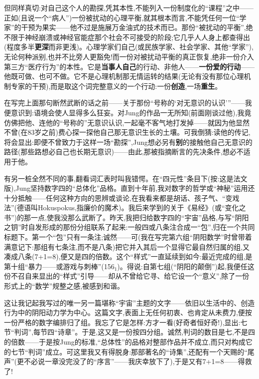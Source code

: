 但同样真切:对自己这个人的勘探,凭其本性,不能列入一份制度化的“课程”之中——正如(且说一个“病人”)一份被扰动的心理平衡,就其根本而言,不能凭任何一位“学家”的干预为果实——他不过是施展万金油式的技术而已。那份“被扰动的平衡”,绝不限于神经崩溃或神经官能症那个社会不可接受的阶段;它几乎人人身上都查得出(程度多半\textbf{更深}而非更浅)。心理学家们自己(或民族学家、社会学家、其他“学家”),无论何种派别,也并不比旁人更豁免!而一份对被扰动平衡的真正恢复,绝非一份介入第三方“医疗行为”的本性。它是\textbf{当事人自己}的行动、非他人——\textbf{一份爱的行动}——他既可做、也可不做。它不是心理机制那无情运转的结果(无论有没有那位心理机制专家的干预),而是取这个词完整意义的一个行动:一份\textbf{创造},一场\textbf{重生}。

在写完上面那句断然武断的话之前——关于那份“号称的\dmark{}‘对无意识的认识’”——我便意识到:语境会使人显得多么狂妄。对Jung的作品一无所知(前面刚谈过他),我竟仿佛把他、连他的“号称的”无意识认识,一起毫不客气地打发掉——就因为他显然不曾(在83岁之前)费心探一探他自己那无意识生长的土壤。可我倒猜:读他的传记,将会显出:即便不曾致力于这样一场“勘探”,Jung想必另有\textbf{别}的接触他自己无意识的路径(那些路想必自己也长期无意识)——由此,那被指摘断言的先决条件,想必不适用于他。

有另一桩全然不同的事,翻看词汇表时叫我错愕。在“四元性”条目下(按:这是法文版),Jung坚持数字四的“总体化”品格。直到十年前,我对数字的哲学或“神秘”运用还十分抵触——任何这种方向的思辨或谈论,在我看来都是胡话、孩子气、“变戏法”(德语叫Hokuspokus,指廉价的魔术)。我后来学到的关于《易经》(或“变化之书”)的那一点,使我没那么武断了。昨天,我把归给数字四的“宇宙”品格,与写“阴阳之钥”时自发形成的那份分组联系了起来:一般四或八条注合成一“包”,归在一个共同标题下。第一个“包”只有一条注;诚然——可(我在写完第六组“阴阳数学”时曾带着满意记下:那组有七条注,而不是八条)把它并入其后一个显得它最自然归属的组,又凑成八条(7+1=8),便又是四的倍数。这个“样式”一直延续到如今:最近完成的组,是第十组“暴力——或游戏与刺棒”(156$_{1}$)。得说:自第七组(“阴阳的颠倒”)起,我便任这份不召自来显出的“样式”引导——却从不曾给它寻、给它设一个“意义”,除了一份形式上的“数学”规整之感,被感到和谐。

这让我记起我写过的唯一另一篇堪称“宇宙”主题的文字——依旧以生活中的、创造行为中的阴阳动力学为中心\dmark{}。这篇文字,表面上无任何初衷、也肯定从未费力,便按一份严格的数字编排归了组。我忘了它是怎样:方才一看(好奇者恒好奇!),显出:七节“判词”,每节四“诗章”。于是,这又是一份按四分组。诚然,判词的数目是七,不是四的倍数——于是按Jung的标准,“总体性”的品格对整部作品并不成立,而只对构成它的七节“判词”成立。可这里我又有得脱身:那部著名的“诗集”,还配有一个天赐的“尾声”(更不必说一章没完没了的“序言”——我庆幸放下了),于是又有7+1=8——得救了!


